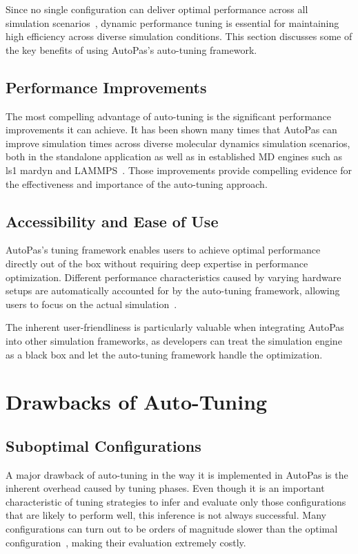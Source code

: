 \documentclass[conference]{IEEEtran}
\begin{document}
Since no single configuration can deliver optimal performance across all simulation scenarios~\cite{Tchipev2020}, dynamic performance tuning is essential for maintaining high efficiency across diverse simulation conditions. This section discusses some of the key benefits of using AutoPas's auto-tuning framework.

\subsection*{Performance Improvements}

The most compelling advantage of auto-tuning is the significant performance improvements it can achieve. It has been shown many times that AutoPas can improve simulation times across diverse molecular dynamics simulation scenarios, both in the standalone application as well as in established MD engines such as ls1 mardyn and LAMMPS~\cite{SECKLER2021101296}\cite{Gratl2022AutoPas}. Those improvements provide compelling evidence for the effectiveness and importance of the auto-tuning approach.

\subsection*{Accessibility and Ease of Use}

AutoPas's tuning framework enables users to achieve optimal performance directly out of the box without requiring deep expertise in performance optimization. Different performance characteristics caused by varying hardware setups are automatically accounted for by the auto-tuning framework, allowing users to focus on the actual simulation~\cite{Tchipev2020}.

The inherent user-friendliness is particularly valuable when integrating AutoPas into other simulation frameworks, as developers can treat the simulation engine as a black box and let the auto-tuning framework handle the optimization.

\section{Drawbacks of Auto-Tuning}

\subsection*{Suboptimal Configurations}

A major drawback of auto-tuning in the way it is implemented in AutoPas is the inherent overhead caused by tuning phases. Even though it is an important characteristic of tuning strategies to infer and evaluate only those configurations that are likely to perform well, this inference is not always successful. Many configurations can turn out to be orders of magnitude slower than the optimal configuration~\cite{endreport.pdf}\cite{Manuel_Lerchner_Thesis.pdf}, making their evaluation extremely costly.
\end{document}
